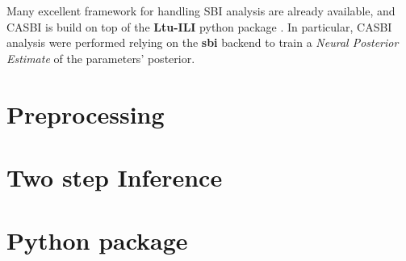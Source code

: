 Many excellent framework for handling SBI analysis are already available, and CASBI is build on top of the \textbf{Ltu-ILI} python package \cite{hoLtUILIAllinOneFramework2024}. In particular, CASBI analysis were performed relying on the \textbf{sbi} backend \cite{tejero-canteroSbiToolkitSimulationbased2020} to train a \textit{Neural Posterior Estimate} of the parameters' posterior. 


\section{Preprocessing}

\section{Two step Inference}

\section{Python package}